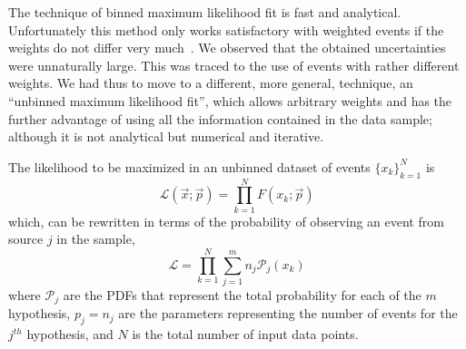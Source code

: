 The technique of binned maximum likelihood fit is fast and analytical. Unfortunately this method only works satisfactory with weighted events if the weights do not differ very much~\cite{Barlow1993219}.
We observed that the obtained uncertainties were unnaturally large.  This was traced to the use of events with rather different weights.
We had thus to move to a different, more general, technique, an ``unbinned maximum likelihood fit'',  which allows arbitrary weights and has the further advantage of using all the information contained in the data sample; although it is not analytical but numerical and iterative. 

The likelihood to be maximized in an unbinned dataset of events $\{x_k\}^N_{k=1}$ is
%
\begin{equation}
\mathcal{L}(\vec{x};\vec{p}) =\prod^N_{k=1} F(x_k;\vec{p})
\end{equation}
%
which, can be rewritten in terms of the probability of observing an event from source $j$ in the sample,
%
\begin{equation}
\mathcal{L} =  \prod^N_{k=1} \sum^m_{j=1} n_j  \mathcal{P}_j(x_k)
\end{equation}
%
where $\mathcal{P}_j$ are the PDFs that represent the total probability for each of the $m$ hypothesis, $p_j=n_j$ are the parameters representing the number of events for the $j^{th}$ hypothesis, and $N$ is the total number of input data points.


